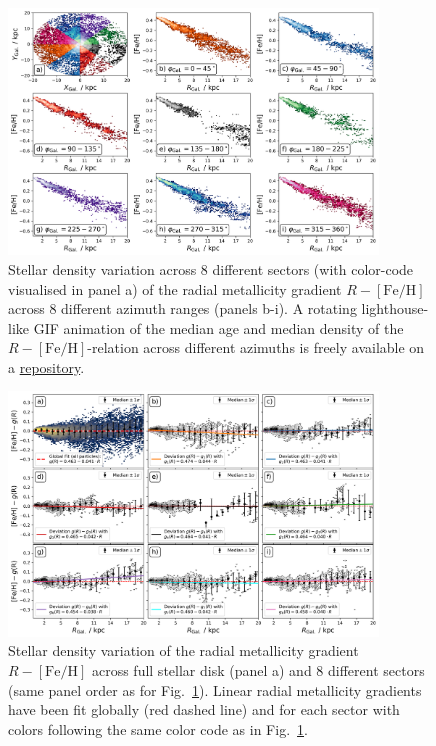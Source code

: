 \documentclass[fleqn,usenatbib]{mnras}
\begin{document}
\begin{figure}
    \centering
    \includegraphics[width=0.875\textwidth]{figures/radial_metallicity_gradients_mw_in_angles.png}
    \caption{Stellar density variation across 8 different sectors (with color-code visualised in panel a) of the radial metallicity gradient $R-\mathrm{[Fe/H]}$ across 8 different azimuth ranges (panels b-i). A rotating lighthouse-like GIF animation of the median age and median density of the $R-\mathrm{[Fe/H]}$-relation across different azimuths is freely available on a \href{https://github.com/svenbuder/nihao_radial_metallicity_gradients/blob/main/figures/xyz_rfeh.gif}{repository}.}
    \label{fig:radial_metallicity_gradients_mw_in_angles}
\end{figure}

\begin{figure}
    \centering
    \includegraphics[width=0.875\textwidth]{figures/linear_radial_metallicity_gradients_mw_in_angles.png}
    \caption{Stellar density variation of the radial metallicity gradient $R-\mathrm{[Fe/H]}$ across full stellar disk (panel a) and 8 different sectors (same panel order as for Fig.~\ref{fig:radial_metallicity_gradients_mw_in_angles}). Linear radial metallicity gradients have been fit globally (red dashed line) and for each sector with colors following the same color code as in Fig.~\ref{fig:radial_metallicity_gradients_mw_in_angles}.}    \label{fig:linear_radial_metallicity_gradients_mw_in_angles}
\end{figure}
\end{document}
